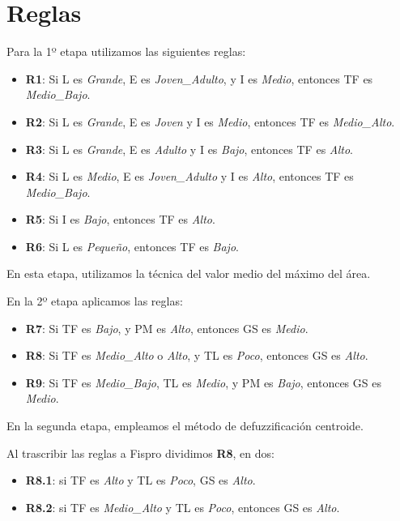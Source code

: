 \documentclass[a4paper, 8pt]{article}
\begin{document}
\section{Reglas}

Para la 1º etapa utilizamos las siguientes reglas:

\begin{itemize}
    \item \textbf{R1}: Si L es \textit{Grande}, E es \textit{Joven\_Adulto}, y I es \textit{Medio}, entonces TF es \textit{Medio\_Bajo}.
    \item \textbf{R2}: Si L es \textit{Grande}, E es \textit{Joven} y I es \textit{Medio}, entonces TF es \textit{Medio\_Alto}.
    \item \textbf{R3}: Si L es \textit{Grande}, E es \textit{Adulto} y I es \textit{Bajo}, entonces TF es \textit{Alto}.
    \item \textbf{R4}: Si L es \textit{Medio}, E es \textit{Joven\_Adulto} y I es \textit{Alto}, entonces TF es \textit{Medio\_Bajo}.
    \item \textbf{R5}: Si I es \textit{Bajo}, entonces TF es \textit{Alto}.
    \item \textbf{R6}: Si L es \textit{Pequeño}, entonces TF es \textit{Bajo}.
\end{itemize}

En esta etapa, utilizamos la técnica del valor medio del máximo del área.

\vspace{2 mm}

En la 2º etapa aplicamos las reglas:

\begin{itemize}
    \item \textbf{R7}: Si TF es \textit{Bajo}, y PM es \textit{Alto}, entonces GS es \textit{Medio}.
    \item \textbf{R8}: Si TF es \textit{Medio\_Alto} o \textit{Alto}, y TL es \textit{Poco}, entonces GS es \textit{Alto}.
    \item \textbf{R9}: Si TF es \textit{Medio\_Bajo}, TL es \textit{Medio}, y PM es \textit{Bajo}, entonces GS es \textit{Medio}.
    \end{itemize}

En la segunda etapa, empleamos el método de defuzzificación centroide.
\vspace{2 mm}

Al trascribir las reglas a Fispro dividimos \textbf{R8}, en dos:
\begin{itemize}
    \item \textbf{R8.1}: si TF es \textit{Alto} y TL es \textit{Poco}, GS es \textit{Alto}.
    \item \textbf{R8.2}: si TF es \textit{Medio\_Alto} y TL es \textit{Poco}, entonces GS es \textit{Alto}.
    \end{itemize}
    
\end{document}
